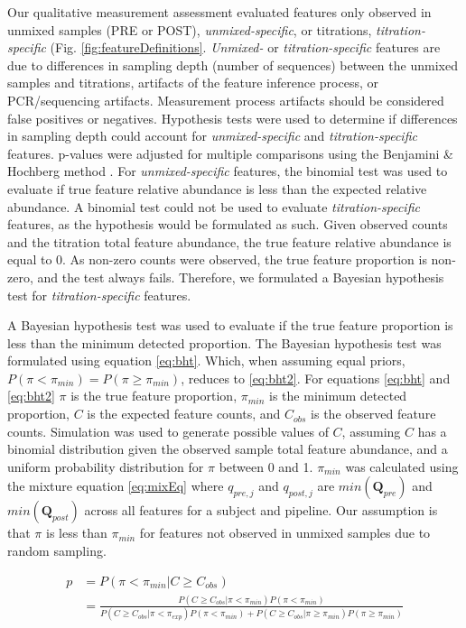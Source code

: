 \documentclass[linenumbers]{bmcart}
\begin{document}
Our qualitative measurement assessment evaluated features only observed
in unmixed samples (PRE or POST), \emph{unmixed-specific}, or
titrations, \emph{titration-specific} (Fig.
\ref{fig:featureDefinitions}. \emph{Unmixed-} or
\emph{titration-specific} features are due to differences in sampling
depth (number of sequences) between the unmixed samples and titrations,
artifacts of the feature inference process, or PCR/sequencing artifacts.
Measurement process artifacts should be considered false positives or
negatives. Hypothesis tests were used to determine if differences in
sampling depth could account for \emph{unmixed-specific} and
\emph{titration-specific} features. p-values were adjusted for multiple
comparisons using the Benjamini \& Hochberg method
\cite{benjamini1995controlling}. For \emph{unmixed-specific} features,
the binomial test was used to evaluate if true feature relative
abundance is less than the expected relative abundance. A binomial test
could not be used to evaluate \emph{titration-specific} features, as the
hypothesis would be formulated as such. Given observed counts and the
titration total feature abundance, the true feature relative abundance
is equal to 0. As non-zero counts were observed, the true feature
proportion is non-zero, and the test always fails. Therefore, we
formulated a Bayesian hypothesis test for \emph{titration-specific}
features.

A Bayesian hypothesis test was used to evaluate if the true feature
proportion is less than the minimum detected proportion. The Bayesian
hypothesis test was formulated using equation \eqref{eq:bht}. Which, when
assuming equal priors, \(P(\pi < \pi_{min}) = P(\pi \geq \pi_{min})\),
reduces to \eqref{eq:bht2}. For equations \eqref{eq:bht} and \eqref{eq:bht2}
\(\pi\) is the true feature proportion, \(\pi_{min}\) is the minimum
detected proportion, \(C\) is the expected feature counts, and
\(C_{obs}\) is the observed feature counts. Simulation was used to
generate possible values of \(C\), assuming \(C\) has a binomial
distribution given the observed sample total feature abundance, and a
uniform probability distribution for \(\pi\) between 0 and 1.
\(\pi_{min}\) was calculated using the mixture equation \eqref{eq:mixEq}
where \(q_{pre,j}\) and \(q_{post,j}\) are \(min(\textbf{Q}_{pre})\) and
\(min(\textbf{Q}_{post})\) across all features for a subject and
pipeline. Our assumption is that \(\pi\) is less than \(\pi_{min}\) for
features not observed in unmixed samples due to random sampling.

\begin{equation}
  \begin{split}
    p & = P(\pi < \pi_{min} | C \geq C_{obs}) \\
      & = \frac{P(C \geq C_{obs}| \pi < \pi_{min})P(\pi < \pi_{min})}{P(C \geq C_{obs}| \pi < \pi_{exp})P(\pi < \pi_{min}) + P(C \geq C_{obs}| \pi \geq \pi_{min})P(\pi \geq \pi_{min})} \\
  \end{split}
  \label{eq:bht}
\end{equation}
\end{document}
